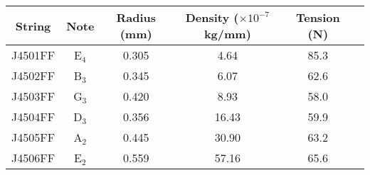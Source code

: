 \begin{tabular}{cccccc}
\toprule
String & Note & Radius (mm) & Density ($\times 10^{-7}$ kg/mm) & Tension (N) \\
\midrule
J4501FF & E$_{4}$ & 0.305 & 4.64 & 85.3 \\
J4502FF & B$_{3}$ & 0.345 & 6.07 & 62.6 \\
J4503FF & G$_{3}$ & 0.420 & 8.93 & 58.0 \\
J4504FF & D$_{3}$ & 0.356 & 16.43 & 59.9 \\
J4505FF & A$_{2}$ & 0.445 & 30.90 & 63.2 \\
J4506FF & E$_{2}$ & 0.559 & 57.16 & 65.6 \\
\bottomrule
\end{tabular}

